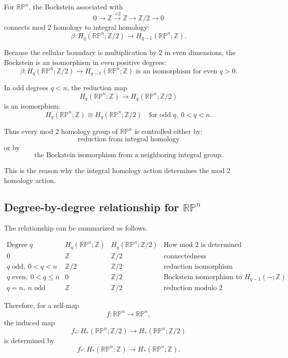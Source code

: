 \documentclass[12pt,a4paper]{article}
\theoremstyle{notespace}
\begin{document}
For \(\mathbb{RP}^n\), the Bockstein associated with
\[
0
\longrightarrow
\mathbb Z
\xrightarrow{\times 2}
\mathbb Z
\longrightarrow
\mathbb Z/2
\longrightarrow
0
\]
connects mod \(2\) homology to integral homology:
\[
\beta:
H_q(\mathbb{RP}^n;\mathbb Z/2)
\longrightarrow
H_{q-1}(\mathbb{RP}^n;\mathbb Z).
\]

Because the cellular boundary is multiplication by \(2\) in even dimensions, the Bockstein is an isomorphism in even positive degrees:
\[
\boxed{
	\beta:
	H_q(\mathbb{RP}^n;\mathbb Z/2)
	\longrightarrow
	H_{q-1}(\mathbb{RP}^n;\mathbb Z)
	\text{ is an isomorphism for even }q>0.
}
\]

In odd degrees \(q<n\), the reduction map
\[
H_q(\mathbb{RP}^n;\mathbb Z)
\longrightarrow
H_q(\mathbb{RP}^n;\mathbb Z/2)
\]
is an isomorphism:
\[
\boxed{
	H_q(\mathbb{RP}^n;\mathbb Z)\cong H_q(\mathbb{RP}^n;\mathbb Z/2)
	\quad
	\text{for odd }q,\ 0<q<n.
}
\]

Thus every mod \(2\) homology group of \(\mathbb{RP}^n\) is controlled either by:
\[
\text{reduction from integral homology}
\]
or by
\[
\text{the Bockstein isomorphism from a neighboring integral group}.
\]

This is the reason why the integral homology action determines the mod \(2\) homology action.

\subsection{Degree-by-degree relationship for \(\mathbb{RP}^n\)}

The relationship can be summarized as follows.

\[
\begin{array}{c|c|c|c}
	\text{Degree }q
	&
	H_q(\mathbb{RP}^n;\mathbb Z)
	&
	H_q(\mathbb{RP}^n;\mathbb Z/2)
	&
	\text{How mod }2\text{ is determined}
	\\
	\hline
	0
	&
	\mathbb Z
	&
	\mathbb Z/2
	&
	\text{connectedness}
	\\[1mm]
	q\text{ odd},\ 0<q<n
	&
	\mathbb Z/2
	&
	\mathbb Z/2
	&
	\text{reduction isomorphism}
	\\[1mm]
	q\text{ even},\ 0<q\le n
	&
	0
	&
	\mathbb Z/2
	&
	\text{Bockstein isomorphism to }H_{q-1}(-;\mathbb Z)
	\\[1mm]
	q=n,\ n\text{ odd}
	&
	\mathbb Z
	&
	\mathbb Z/2
	&
	\text{reduction modulo }2
\end{array}
\]

Therefore, for a self-map
\[
f:\mathbb{RP}^n\longrightarrow \mathbb{RP}^n,
\]
the induced map
\[
f_*:H_*(\mathbb{RP}^n;\mathbb Z/2)
\longrightarrow
H_*(\mathbb{RP}^n;\mathbb Z/2)
\]
is determined by
\[
f_*:H_*(\mathbb{RP}^n;\mathbb Z)
\longrightarrow
H_*(\mathbb{RP}^n;\mathbb Z).
\]
\end{document}
